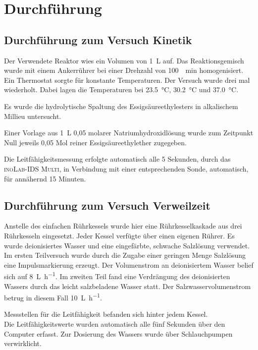 \section{Durchführung}
\label{sec:durchfuerung}

\subsection{Durchführung zum Versuch Kinetik}
Der Verwendete Reaktor wies ein Volumen von \SI{1}{\liter} auf. Das Reaktionsgemisch wurde mit einem Ankerrührer bei einer Drehzahl von \SI{100}{\per\minute} homogenisiert. Ein Thermostat sorgte für konstante Temperaturen. 
Der Versuch wurde drei mal wiederholt. Dabei lagen die Temperaturen bei \SI{23,5}{\degreeCelsius}, \SI{30,2}{\degreeCelsius} und \SI{37,0}{\degreeCelsius}.

Es wurde die hydrolytische Spaltung des Essigsäureethylesters in alkalischem Millieu untersucht. 

Einer Vorlage aus \SI{1}{\liter} 0,05 molarer Natriumhydroxidlösung wurde zum Zeitpunkt Null jeweils 0,05 Mol reiner Essigsäureethylether zugegeben.   

Die Leitfähigkeitsmessung erfolgte automatisch alle 5 Sekunden, durch das \textsc{inoLab-IDS Multi}, in Verbindung mit einer entsprechenden Sonde, automatisch, für annähernd 15 Minuten.

\subsection{Durchführung zum Versuch Verweilzeit}

Anstelle des einfachen Rührkessels wurde hier eine Rührkesselkaskade aus drei Rührkesseln eingesetzt. Jeder Kessel verfügte über einen eigenen Rührer. Es wurde deionisiertes Wasser und eine eingefärbte, schwache Salzlösung verwendet. 
Im ersten Teilversuch wurde durch die Zugabe einer geringen Menge Salzlösung eine Impulsmarkierung erzeugt.  
Der Volumenstrom an deionisiertem Wasser belief sich auf \SI{8}{\liter\per\hour}.\linebreak
Im zweiten Teil fand eine Verdrängung des deionisierten Wassers durch das leicht salzbeladene Wasser statt. Der Salzwasservolumenstrom betrug in diesem Fall \SI{10}{\liter\per\hour}.

Messstellen für die Leitfähigkeit befanden sich hinter jedem Kessel. \\Die Leitfähigkeitswerte wurden automatisch alle fünf Sekunden über den Computer erfasst.
Zur Dosierung des Wassers wurde über Schlauchpumpen verwirklicht.
